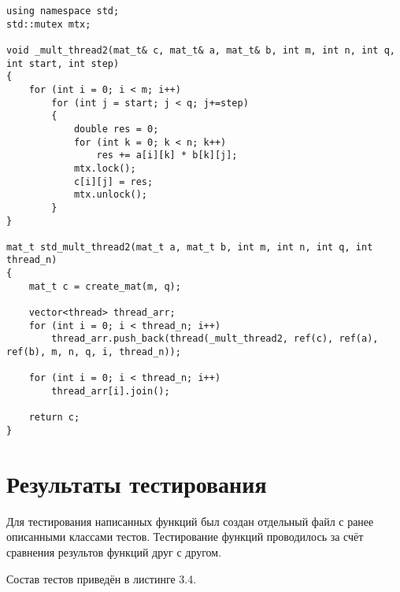 \begin{lstlisting}[caption = {Функция умножения матриц (параллельная по столбцам)}]
using namespace std;
std::mutex mtx;

void _mult_thread2(mat_t& c, mat_t& a, mat_t& b, int m, int n, int q, int start, int step)
{
	for (int i = 0; i < m; i++)
		for (int j = start; j < q; j+=step)
		{
			double res = 0;
			for (int k = 0; k < n; k++)
				res += a[i][k] * b[k][j];
			mtx.lock();
			c[i][j] = res;
			mtx.unlock();
		}
}

mat_t std_mult_thread2(mat_t a, mat_t b, int m, int n, int q, int thread_n)
{
	mat_t c = create_mat(m, q);
	
	vector<thread> thread_arr;
	for (int i = 0; i < thread_n; i++)
		thread_arr.push_back(thread(_mult_thread2, ref(c), ref(a), ref(b), m, n, q, i, thread_n));
	
	for (int i = 0; i < thread_n; i++)
		thread_arr[i].join();
	
	return c;
}
\end{lstlisting}


\section{Результаты тестирования}
Для тестирования написанных функций был создан отдельный файл с ранее описанными классами тестов. Тестирование функций проводилось за счёт сравнения результов функций друг с другом.

Состав тестов приведён в листинге 3.4.

